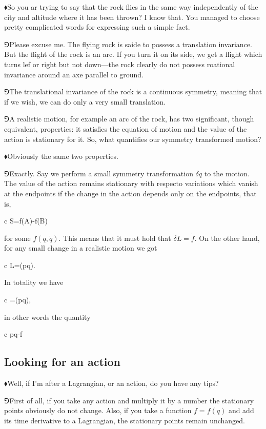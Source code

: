 \documentclass[11pt,oneside%
]{memoir}
\newenvironment{eqna}{\begin{IEEEeqnarray*}{c}}{\end{IEEEeqnarray*}\ignorespacesafterend}
\newcommand{\der}[2]{\frac{\dd#1}{\dd#2}}
\newcommand{\dd}{\mathrm{d}}
\newcommand{\hea}{\(\blacklozenge\)\;}
\newcommand{\heb}{\(\Game\)\;}
\begin{document}
\hea So you ar trying to say that the rock flies in the same way independently of the city and altitude where it has been thrown? I know that. You managed to choose pretty complicated words for expressing such a simple fact.

\heb Please excuse me. The flying rock is saide to possess a translation invariance. But the flight of the rock is an arc. If you turn it on its side, we get a flight which turns lef or right but not down---the rock clearly do not possess roational invariance around an axe parallel to ground.

\heb The translational invariance of the rock is a continuous symmetry, meaning that if we wish, we can do only a very small translation.

\heb A realistic motion, for example an arc of the rock, has two significant, though equivalent, properties: it satisfies the equation of motion and the value of the action is stationary for it. So, what quantifies our symmetry transformed motion?

\hea Obviously the same two properties.

\heb Exactly. Say we perform a small symmetry transformation \(\delta q\) to the motion. The value of the action remains stationary with respecto variations which vanish at the endpoints if the change in the action depends only on the endpoints, that is,
\begin{eqna}
    \delta S=f(A)-f(B)
\end{eqna}
for some \(f(q,\dot{q})\). This means that it must hold that \(\delta L=\dot{f}\). On the other hand, for any small change in a realistic motion we got
\begin{eqna}
    \delta L=\der{}{t}(p\cdot\delta q).
\end{eqna}
In totality we have
\begin{eqna}
    =\der{}{t}(p\cdot\delta q),
\end{eqna}
in other words the quantity
\begin{eqna}
    p\cdot\delta q-f
\end{eqna}
\subsection{Looking for an action}
\hea Well, if I'm after a Lagrangian, or an action, do you have any tips?

\heb First of all, if you take any action and multiply it by a number the stationary points obviously do not change. Also, if you take a function \(f=f(q)\) and add its time derivative to a Lagrangian, the stationary points remain unchanged.
\end{document}
